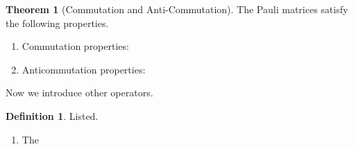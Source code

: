 \documentclass{article}
\theoremstyle{definition}
\newtheorem{theorem}{Theorem}[section]
\newtheorem{definition}{Definition}[section]
\begin{document}
      \begin{theorem}[Commutation and Anti-Commutation]
        The Pauli matrices satisfy the following properties. 
        \begin{enumerate}
          \item Commutation properties: 
           

          \item Anticommutation properties: 


        \end{enumerate}
      \end{theorem}

      Now we introduce other operators. 

      \begin{definition}
        Listed. 
        \begin{enumerate}
          \item The 
        \end{enumerate}
      \end{definition}
\end{document}
